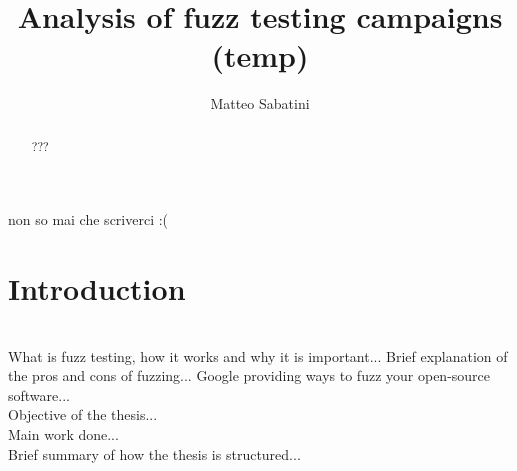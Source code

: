 \documentclass[Lau,oneside]{sapthesis}%
\title{Analysis of fuzz testing campaigns (temp)}
\author{Matteo Sabatini}
\begin{document}
\setlength{\parindent}{0pt}    %
\frontmatter
\maketitle

\begin{acknowledgments}
non so mai che scriverci :(
\end{acknowledgments}


\begin{abstract}
???
\newline \newline
\end{abstract}




\tableofcontents


\titleformat{\chapter}[display]  
{\normalfont\Huge\bfseries}{\chaptertitlename\ \thechapter}{20pt}{\huge}  
\titlespacing{\chapter}{0pt}{0pt}{0pt}  

\mainmatter
\chapter{Introduction}
\ \\
What is fuzz testing, how it works and why it is important...
\newline \newline
Brief explanation of the pros and cons of fuzzing...
\newline \newline
Google providing ways to fuzz your open-source software...
\newline \ \\
Objective of the thesis...
\newline \ \\
Main work done...
\newline \ \\
Brief summary of how the thesis is structured...
\end{document}
